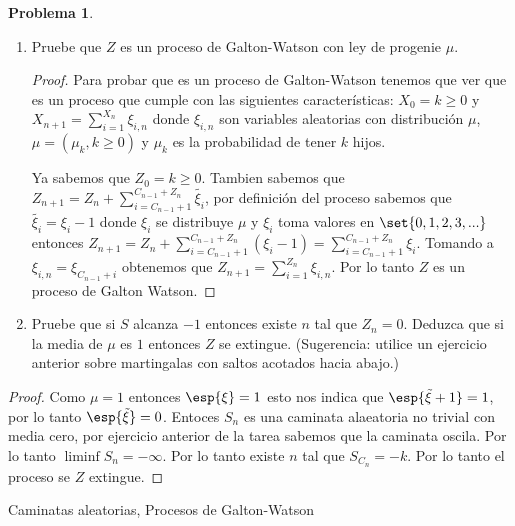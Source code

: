 \documentclass[a5paper,oneside]{amsart}
\theoremstyle{plain}
\theoremstyle{definition}
\newtheorem{problema}{Problema}
\begin{document}
\begin{problema}
\begin{enumerate}
\item Pruebe que $Z$ es un proceso de Galton-Watson con ley de progenie $\mu$.
\begin{proof}
Para probar que es un proceso de Galton-Watson tenemos que ver que es un proceso que cumple con las siguientes caracter\'isticas: $X_0=k\geq 0$ y $X_{n+1}=\sum_{i=1}^{X_n}\xi_{i,n}$ donde $\xi_{i,n}$ son variables aleatorias con distribuci\'on $\mu$, $\mu=(\mu_k, k\geq 0)$ y $\mu_k$ es la probabilidad de tener $k$ hijos. 

Ya sabemos que $Z_0=k\geq 0$. Tambien sabemos que $Z_{n+1}=Z_n+\sum_{i=C_{n-1}+1}^{C_{n-1}+Z_n}\tilde{\xi_i}$, por definici\'on del proceso sabemos que $\tilde{\xi_i}=\xi_i-1$ donde $\xi_i$ se distribuye $\mu$ y $\xi_i$ toma valores en $\set{0,1,2,3,...}$ entonces $Z_{n+1}=Z_n+\sum_{i=C_{n-1}+1}^{C_{n-1}+Z_n}(\xi_i-1)=\sum_{i=C_{n-1}+1}^{C_{n-1}+Z_n}\xi_i$. Tomando a $\xi_{i,n}=\xi_{C_{n-1}+i}$ obtenemos que $Z_{n+1}=\sum_{i=1}^{Z_n}\xi_{i,n}$. Por lo tanto $Z$ es un proceso de Galton Watson.
\end{proof}
\item Pruebe que si $S$ alcanza $-1$ entonces existe $n$ tal que $Z_n=0$. Deduzca que si la media de $\mu$ es $1$ entonces $Z$ se extingue. (Sugerencia: utilice un ejercicio anterior sobre martingalas con saltos acotados hacia abajo.) 
\end{enumerate}

\begin{proof}
Como $\mu=1$ entonces $\esp{\xi}=1$ esto nos indica que $\esp{\tilde{\xi}+1}=1$, por lo tanto $\esp{\tilde{\xi}}=0$. Entoces $S_n$ es una caminata alaeatoria no trivial con media cero, por ejercicio anterior de la tarea sabemos que la caminata oscila. Por lo tanto $\liminf S_n=-\infty$. Por lo tanto  existe $n$ tal que $S_{C_n}=-k$. Por lo tanto el proceso se $Z$ extingue.
\end{proof}

 Caminatas aleatorias, Procesos de Galton-Watson%
\end{problema}
\end{document}
